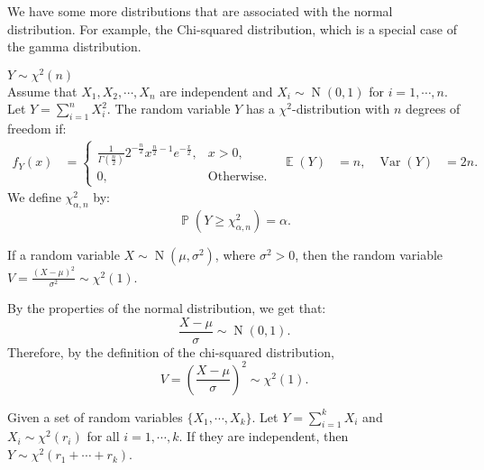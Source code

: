 \documentclass{huhtakm-template-book-v2}
\DeclareMathOperator{\prob}{\mathbb{P}}
\DeclareMathOperator{\E}{\mathbb{E}}
\DeclareMathOperator{\Var}{Var}
\DeclareMathOperator{\N}{N}
\begin{document}
    We have some more distributions that are associated with the normal distribution. For example, the Chi-squared distribution, which is a special case of the gamma distribution.
    \begin{eg} $Y \sim \chi^{2}(n)$\\
        Assume that $X_{1}, X_{2}, \cdots, X_{n}$ are independent and $X_{i} \sim \N(0, 1)$ for $i = 1, \cdots, n$. Let $Y = \sum_{i=1}^{n} X_{i}^{2}$. The random variable $Y$ has a $\chi^{2}$-distribution with $n$ degrees of freedom if:
        \begin{align*}
            f_{Y}(x) &= \begin{cases}
                \frac{1}{\Gamma\left(\frac{n}{2}\right)} 2^{-\frac{n}{2}} x^{\frac{n}{2} - 1} e^{-\frac{x}{2}}, &x > 0,\\
                0, &\text{Otherwise}.
            \end{cases} & \E(Y) &= n, & \Var(Y) &= 2n.
        \end{align*}
        We define $\chi^{2}_{\alpha, n}$ by:
        \begin{equation*}
            \prob(Y \geq \chi^{2}_{\alpha, n}) = \alpha.
        \end{equation*}
    \end{eg} 
    \begin{thm}
        \label{Chapter 1 (Theorem) chi-square distribution with 1 degree of freedom}
        If a random variable $X \sim \N(\mu, \sigma^{2})$, where $\sigma^{2} > 0$, then the random variable $V = \frac{(X - \mu)^{2}}{\sigma^{2}} \sim \chi^{2}(1)$.
    \end{thm}
    \begin{proofing}
        By the properties of the normal distribution, we get that:
        \begin{equation*}
            \frac{X - \mu}{\sigma} \sim \N(0, 1).
        \end{equation*}
        Therefore, by the definition of the chi-squared distribution,
        \begin{equation*}
            V = \left(\frac{X - \mu}{\sigma}\right)^{2} \sim \chi^{2}(1).
        \end{equation*}
    \end{proofing}
    \begin{thm}
        Given a set of random variables $\{X_{1}, \cdots, X_{k}\}$. Let $Y = \sum_{i=1}^{k} X_{i}$ and $X_{i} \sim \chi^{2}(r_{i})$ for all $i = 1, \cdots, k$. If they are independent, then $Y \sim \chi^{2}(r_{1} + \cdots + r_{k})$.
    \end{thm}
\end{document}
